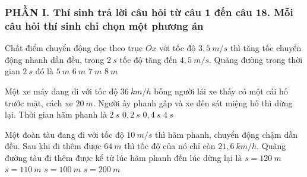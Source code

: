 \subsubsection*{PHẦN I. Thí sinh trả lời câu hỏi từ câu 1 đến câu 18. Mỗi câu hỏi thí sinh chỉ chọn một phương án}
\setcounter{ex}{0}
\begin{ex}%
Chất điểm chuyển động dọc theo trục $Ox$ với tốc độ $3,5\ m/s$ thì tăng tốc chuyển động nhanh dần đều, trong $2\ s$ tốc độ tăng đến $4,5\ m/s$. Quãng đường trong thời gian $2\ s$ đó là
\choice
{$5\ m$}
{$6\ m$}
{$7\ m$}
{\True $8\ m$}
\end{ex}
\begin{ex}%
Một xe máy đang đi với tốc độ $36\ km/h$ bỗng người lái xe thấy có một cái hố trước mặt, cách xe $20\ m$. Người ấy phanh gấp và xe đến sát miệng hố thì dừng lại. Thời gian hãm phanh là
\choice
{$2\ s$}
{$0,2\ s$}
{$0,4\ s$}
{\True $4\ s$}
 \end{ex}
\begin{ex}%
Một đoàn tàu đang đi với tốc độ $10\ m/s$ thì hãm phanh, chuyển động chậm dần đều. Sau khi đi thêm được $64\ m$ thì tốc độ của nó chỉ còn $21,6\ km/h$. Quãng đường tàu đi thêm được kể từ lúc hãm phanh đến lúc dừng lại là
\choice
{$s = 120\ m$}
{$s = 110\ m$}
{\True $s = 100\ m$}
{$s = 200\ m$}	
 \end{ex}
